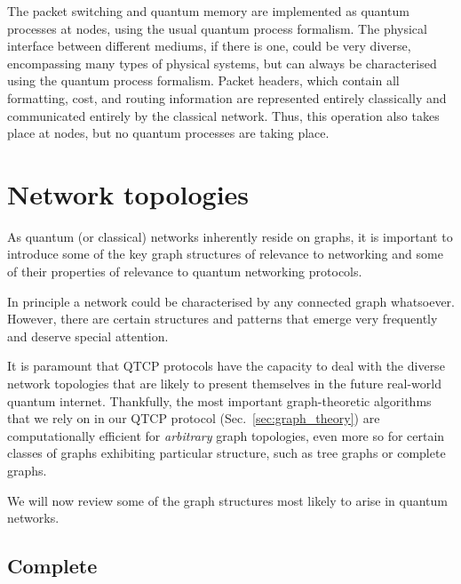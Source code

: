 \documentclass[aps,rmp,twocolumn,amsmath,amssymb,nofootinbib,superscriptaddress,longbibliography,floatfix]{revtex4-1}
\begin{document}
The packet switching and quantum memory are implemented as quantum processes at nodes, using the usual quantum process formalism. The physical interface between different mediums, if there is one, could be very diverse, encompassing many types of physical systems, but can always be characterised using the quantum process formalism. Packet headers, which contain all formatting, cost, and routing information are represented entirely classically and communicated entirely by the classical network. Thus, this operation also takes place at nodes, but no quantum processes are taking place.

%
%

\section{Network topologies}

As quantum (or classical) networks inherently reside on graphs, it is important to introduce some of the key graph structures of relevance to networking and some of their properties of relevance to quantum networking protocols.

In principle a network could be characterised by any connected graph whatsoever. However, there are certain structures and patterns that emerge very frequently and deserve special attention.

It is paramount that QTCP protocols have the capacity to deal with the diverse network topologies that are likely to present themselves in the future real-world quantum internet. Thankfully, the most important graph-theoretic algorithms that we rely on in our QTCP protocol (Sec.~\ref{sec:graph_theory}) are computationally efficient for \emph{arbitrary} graph topologies, even more so for certain classes of graphs exhibiting particular structure, such as tree graphs or complete graphs.

We will now review some of the graph structures most likely to arise in quantum networks.

%
%

\subsection{Complete}
\end{document}
